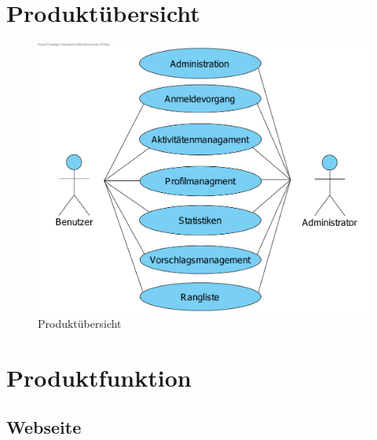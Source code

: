 \documentclass[10pt,a4paper]{article}
\begin{document}



\section{Produkt\"ubersicht}
\begin{figure}[H]
	\includegraphics[width=\textwidth]{gfx/Produktuebersicht}
	 \caption{Produkt\"ubersicht}
\end{figure}


\section{Produktfunktion}
\subsection{Webseite}
\end{document}
